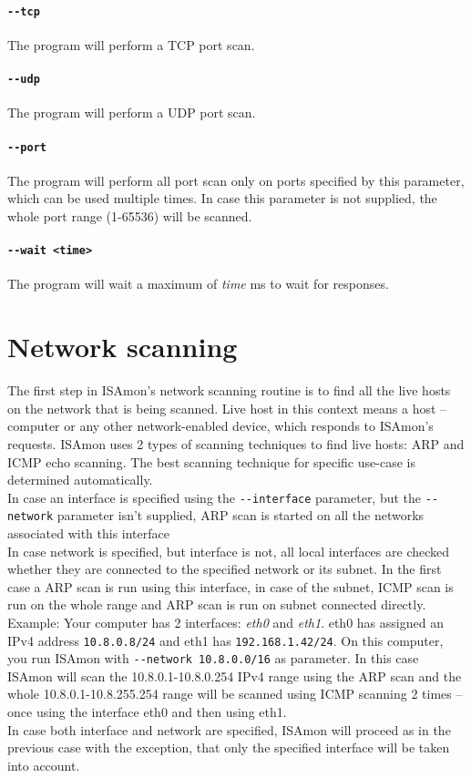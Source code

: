 \documentclass[11pt,a4paper]{article}
\begin{document}
		\paragraph{\texttt{-{}-tcp}} The program will perform a TCP port scan.
		\vspace{-0.5cm}
		\paragraph{\texttt{-{}-udp}} The program will perform a UDP port scan.
		\vspace{-0.5cm}
		\paragraph{\texttt{-{}-port}} The program will perform all port scan only on ports specified by this parameter, which can be used multiple times. In case this parameter is not supplied, the whole port range (1-65536) will be scanned.
		\vspace{-0.5cm}
		\paragraph{\texttt{-{}-wait <time>}} The program will wait a maximum of \emph{time} ms to wait for responses.

\section{Network scanning}
	The first step in ISAmon's network scanning routine is to find all the live hosts on the network that is being scanned. Live host in this context means a host -- computer or any other network-enabled device, which responds to ISAmon's requests. ISAmon uses 2 types of scanning techniques to find live hosts: ARP and ICMP echo scanning. The best scanning technique for specific use-case is determined automatically.\\
	In case an interface is specified using the \texttt{-{}-interface} parameter, but the \texttt{-{}-network} parameter isn't supplied, ARP scan is started on all the networks associated with this interface\\
	In case network is specified, but interface is not, all local interfaces are checked whether they are connected to the specified network or its subnet. In the first case a ARP scan is run using this interface, in case of the subnet, ICMP scan is run on the whole range and ARP scan is run on subnet connected directly. Example: Your computer has 2 interfaces: \emph{eth0} and \emph{eth1}. eth0 has assigned an IPv4 address \texttt{10.8.0.8/24} and eth1 has \texttt{192.168.1.42/24}. On this computer, you run ISAmon with \texttt{-{}-network 10.8.0.0/16} as parameter. In this case ISAmon will scan the 10.8.0.1-10.8.0.254 IPv4 range using the ARP scan and the whole 10.8.0.1-10.8.255.254 range will be scanned using ICMP scanning 2 times -- once using the interface eth0 and then using eth1.\\
	In case both interface and network are specified, ISAmon will proceed as in the previous case with the exception, that only the specified interface will be taken into account.
\end{document}
